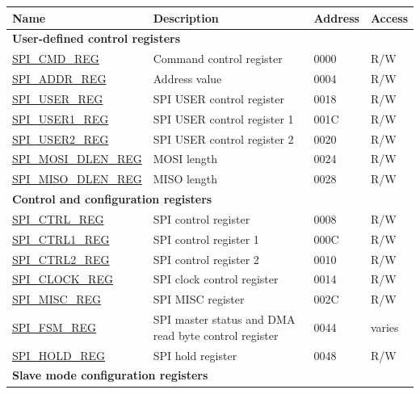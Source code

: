 \begin{longtable}{ | p{6cm} | p{7.2cm} | p{1.3cm} | p{1cm} | }
\hline\rowcolor{lightgray}
Name & Description &  Address & Access \\ \hline
\endhead
\multicolumn{4}{|l|}{\textbf{User-defined control registers}} \\ \hline
\hyperref[regdesc:SPICMDREG]{SPI\_CMD\_REG} & Command control register & \hexprefix{}0000 & R/W \\ \hline
\hyperref[regdesc:SPIADDRREG]{SPI\_ADDR\_REG} & Address value & \hexprefix{}0004 & R/W \\ \hline
\hyperref[regdesc:SPIUSERREG]{SPI\_USER\_REG} & SPI USER control register & \hexprefix{}0018 & R/W \\ \hline
\hyperref[regdesc:SPIUSER1REG]{SPI\_USER1\_REG} & SPI USER control register 1 & \hexprefix{}001C & R/W \\ \hline
\hyperref[regdesc:SPIUSER2REG]{SPI\_USER2\_REG} & SPI USER control register 2 & \hexprefix{}0020 & R/W \\ \hline
\hyperref[regdesc:SPIMOSIDLENREG]{SPI\_MOSI\_DLEN\_REG} & MOSI length & \hexprefix{}0024 & R/W \\ \hline
\hyperref[regdesc:SPIMISODLENREG]{SPI\_MISO\_DLEN\_REG} & MISO length & \hexprefix{}0028 & R/W \\ \hline
\multicolumn{4}{|l|}{\textbf{Control and configuration registers}} \\ \hline
\hyperref[regdesc:SPICTRLREG]{SPI\_CTRL\_REG} & SPI control register & \hexprefix{}0008 & R/W \\ \hline
\hyperref[regdesc:SPICTRL1REG]{SPI\_CTRL1\_REG} & SPI control register 1 & \hexprefix{}000C & R/W \\ \hline
\hyperref[regdesc:SPICTRL2REG]{SPI\_CTRL2\_REG} & SPI control register 2 & \hexprefix{}0010 & R/W \\ \hline
\hyperref[regdesc:SPICLOCKREG]{SPI\_CLOCK\_REG} & SPI clock control register & \hexprefix{}0014 & R/W \\ \hline
\hyperref[regdesc:SPIMISCREG]{SPI\_MISC\_REG} & SPI MISC register & \hexprefix{}002C & R/W \\ \hline
\hyperref[regdesc:SPIFSMREG]{SPI\_FSM\_REG} & SPI master status and DMA read byte control register & \hexprefix{}0044 & varies \\ \hline
\hyperref[regdesc:SPIHOLDREG]{SPI\_HOLD\_REG} & SPI hold register & \hexprefix{}0048 & R/W \\ \hline
\multicolumn{4}{|l|}{\textbf{Slave mode configuration registers}} \\ \hline

\end{longtable}
